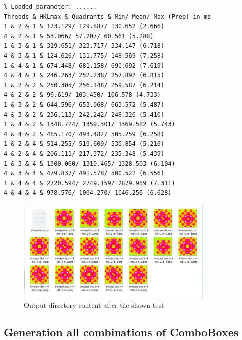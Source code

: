 \documentclass[11pt]{article} %
\begin{document}
\begin{lstlisting}[frame=single, xleftmargin=1cm, xrightmargin=1cm]
% FCC oriented test
% Loaded parameter: ......
Threads & HKLmax & Quadrants & Min/ Mean/ Max (Prep) in ms
1 & 2 & 1 & 123.129/ 129.887/ 130.652 (2.666)
4 & 2 & 1 & 53.066/ 57.207/ 60.561 (5.288)
1 & 3 & 1 & 319.651/ 323.717/ 334.147 (6.718)
4 & 3 & 1 & 124.626/ 131.775/ 148.569 (7.258)
1 & 4 & 1 & 674.448/ 681.158/ 690.692 (7.619)
4 & 4 & 1 & 246.263/ 252.238/ 257.892 (6.815)
1 & 2 & 2 & 250.305/ 256.148/ 259.587 (6.214)
4 & 2 & 2 & 96.619/ 103.450/ 106.578 (4.733)
1 & 3 & 2 & 644.596/ 653.068/ 663.572 (5.487)
4 & 3 & 2 & 236.113/ 242.242/ 248.326 (5.410)
1 & 4 & 2 & 1348.724/ 1359.301/ 1369.582 (5.743)
4 & 4 & 2 & 485.170/ 493.482/ 505.259 (6.258)
1 & 2 & 4 & 514.255/ 519.609/ 530.854 (5.216)
4 & 2 & 4 & 206.111/ 217.372/ 235.348 (5.439)
1 & 3 & 4 & 1300.060/ 1310.465/ 1328.503 (6.104)
4 & 3 & 4 & 479.837/ 491.578/ 500.522 (6.556)
1 & 4 & 4 & 2720.594/ 2749.159/ 2879.959 (7.311)
4 & 4 & 4 & 978.576/ 1004.270/ 1046.256 (6.628)
\end{lstlisting}
\begin{figure}[H]
 \centering
 \includegraphics[width=0.85\textwidth]{timing_test_out.png}
 \caption{Output directory content after the shown test}
 \label{fig:imagemeta}
\end{figure}


\subsection{Generation all combinations of ComboBoxes}
\end{document}
